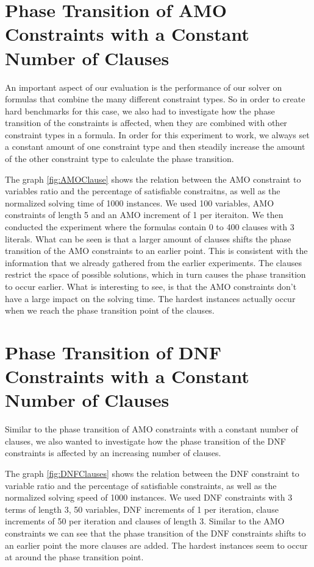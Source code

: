 \section{Phase Transition of AMO Constraints with a Constant Number of Clauses}

An important aspect of our evaluation is the performance of our solver on formulas that combine the many different constraint types. So in order to create hard benchmarks for this case, we also had to investigate how the phase transition of the constraints is affected, when they are combined with other constraint types in a formula. In order for this experiment to work, we always set a constant amount of one constraint type and then steadily increase the amount of the other constraint type to calculate the phase transition.

	

The graph \ref{fig:AMOClause} shows the relation between the AMO constraint to variables ratio and the percentage of satisfiable constraitns, as well as the normalized solving time of 1000 instances. We used 100 variables, AMO constraints of length 5 and an AMO increment of 1 per iteraiton. We then conducted the experiment where the formulas contain 0 to 400 clauses with 3 literals. What can be seen is that a larger amount of clauses shifts the phase transition of the AMO constraints to an earlier point. This is consistent with the information that we already gathered from the earlier experiments. The clauses restrict the space of possible solutions, which in turn causes the phase transition to occur earlier. What is interesting to see, is that the AMO constraints don't have a large impact on the solving time. The hardest instances actually occur when we reach the phase transition point of the clauses.

\section{Phase Transition of DNF Constraints with a Constant Number of Clauses}

Similar to the phase transition of AMO constraints with a constant number of clauses, we also wanted to investigate how the phase transition of the DNF constraints is affected by an increasing number of clauses.

	

The graph \ref{fig:DNFClauses} shows the relation between the DNF constraint to variable ratio and the percentage of satisfiable constraints, as well as the normalized solving speed of 1000 instances. We used DNF constraints with 3 terms of length 3, 50 variables, DNF increments of 1 per iteration, clause increments of 50 per iteration and clauses of length 3. Similar to the AMO constraints we can see that the phase transition of the DNF constraints shifts to an earlier point the more clauses are added. The hardest instances seem to occur at around the phase transition point.

